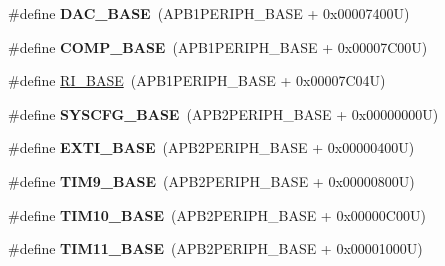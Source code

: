 \begin{DoxyCompactItemize}
\item 
\hypertarget{group___peripheral__memory__map_gad18d0b914c7f68cecbee1a2d23a67d38}{\#define {\bfseries D\-A\-C\-\_\-\-B\-A\-S\-E}~(A\-P\-B1\-P\-E\-R\-I\-P\-H\-\_\-\-B\-A\-S\-E + 0x00007400\-U)}\label{group___peripheral__memory__map_gad18d0b914c7f68cecbee1a2d23a67d38}

\item 
\hypertarget{group___peripheral__memory__map_gaa9f5d2999c6918e385d7a526c4f6b1d3}{\#define {\bfseries C\-O\-M\-P\-\_\-\-B\-A\-S\-E}~(A\-P\-B1\-P\-E\-R\-I\-P\-H\-\_\-\-B\-A\-S\-E + 0x00007\-C00\-U)}\label{group___peripheral__memory__map_gaa9f5d2999c6918e385d7a526c4f6b1d3}

\item 
\#define \hyperlink{group___peripheral__memory__map_ga8fdc749e6f184b3cd9b01f179af62e4c}{R\-I\-\_\-\-B\-A\-S\-E}~(A\-P\-B1\-P\-E\-R\-I\-P\-H\-\_\-\-B\-A\-S\-E + 0x00007\-C04\-U)
\item 
\hypertarget{group___peripheral__memory__map_ga62246020bf3b34b6a4d8d0e84ec79d3d}{\#define {\bfseries S\-Y\-S\-C\-F\-G\-\_\-\-B\-A\-S\-E}~(A\-P\-B2\-P\-E\-R\-I\-P\-H\-\_\-\-B\-A\-S\-E + 0x00000000\-U)}\label{group___peripheral__memory__map_ga62246020bf3b34b6a4d8d0e84ec79d3d}

\item 
\hypertarget{group___peripheral__memory__map_ga87371508b3bcdcd98cd1ec629be29061}{\#define {\bfseries E\-X\-T\-I\-\_\-\-B\-A\-S\-E}~(A\-P\-B2\-P\-E\-R\-I\-P\-H\-\_\-\-B\-A\-S\-E + 0x00000400\-U)}\label{group___peripheral__memory__map_ga87371508b3bcdcd98cd1ec629be29061}

\item 
\hypertarget{group___peripheral__memory__map_ga92ae902be7902560939223dd765ece08}{\#define {\bfseries T\-I\-M9\-\_\-\-B\-A\-S\-E}~(A\-P\-B2\-P\-E\-R\-I\-P\-H\-\_\-\-B\-A\-S\-E + 0x00000800\-U)}\label{group___peripheral__memory__map_ga92ae902be7902560939223dd765ece08}

\item 
\hypertarget{group___peripheral__memory__map_ga3eff32f3801db31fb4b61d5618cad54a}{\#define {\bfseries T\-I\-M10\-\_\-\-B\-A\-S\-E}~(A\-P\-B2\-P\-E\-R\-I\-P\-H\-\_\-\-B\-A\-S\-E + 0x00000\-C00\-U)}\label{group___peripheral__memory__map_ga3eff32f3801db31fb4b61d5618cad54a}

\item 
\hypertarget{group___peripheral__memory__map_ga3a4a06bb84c703084f0509e105ffaf1d}{\#define {\bfseries T\-I\-M11\-\_\-\-B\-A\-S\-E}~(A\-P\-B2\-P\-E\-R\-I\-P\-H\-\_\-\-B\-A\-S\-E + 0x00001000\-U)}\label{group___peripheral__memory__map_ga3a4a06bb84c703084f0509e105ffaf1d}


\end{DoxyCompactItemize}
